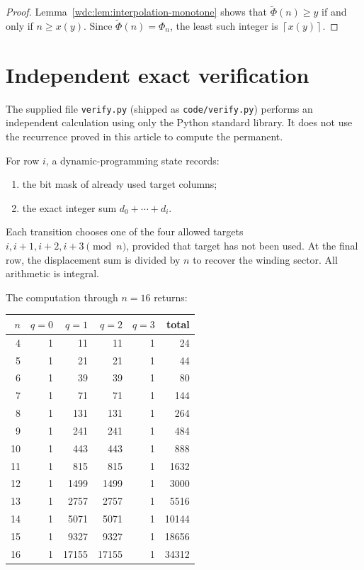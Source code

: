 \documentclass[11pt,letterpaper]{article}
\newcommand{\file}[1]{\nolinkurl{#1}}
\numberwithin{equation}{section}
\theoremstyle{definition}
\newcommand{\ceil}[1]{\left\lceil#1\right\rceil}
\begin{document}
\begin{proof}
Lemma~\ref{wdc:lem:interpolation-monotone} shows that
$\widetilde\Phi(n)\ge y$ if and only if $n\ge x(y)$.  Since
$\widetilde\Phi(n)=\Phi_n$, the least such integer is $\ceil{x(y)}$.
\end{proof}

\section{Independent exact verification}\label{wdc:sec:verification}

The supplied file \file{verify.py} (shipped as \file{code/verify.py})
performs an independent calculation using
only the Python standard library.  It does not use the recurrence proved in
this article to compute the permanent.

For row $i$, a dynamic-programming state records:
\begin{enumerate}[label=(\alph*),leftmargin=2.3em]
\item the bit mask of already used target columns;
\item the exact integer sum $d_0+\cdots+d_i$.
\end{enumerate}
Each transition chooses one of the four allowed targets
$i,i+1,i+2,i+3\pmod n$, provided that target has not been used.  At the final
row, the displacement sum is divided by $n$ to recover the winding sector.
All arithmetic is integral.

The computation through $n=16$ returns:
\begin{center}
\begin{tabular}{r@{\quad}r@{\quad}r@{\quad}r@{\quad}r@{\quad}r}
\toprule
$n$ & $q=0$ & $q=1$ & $q=2$ & $q=3$ & total\\
\midrule
4  &1&11&11&1&24\\
5  &1&21&21&1&44\\
6  &1&39&39&1&80\\
7  &1&71&71&1&144\\
8  &1&131&131&1&264\\
9  &1&241&241&1&484\\
10 &1&443&443&1&888\\
11 &1&815&815&1&1632\\
12 &1&1499&1499&1&3000\\
13 &1&2757&2757&1&5516\\
14 &1&5071&5071&1&10144\\
15 &1&9327&9327&1&18656\\
16 &1&17155&17155&1&34312\\
\bottomrule
\end{tabular}
\end{center}
\end{document}
